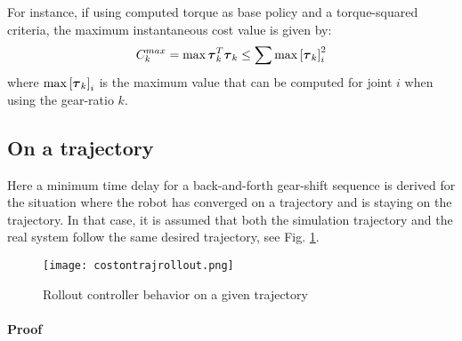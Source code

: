 For instance, if using computed torque as base policy and a torque-squared criteria, the maximum instantaneous cost value is given by:
%
\begin{align}
C_k^{max} =  \operatornamewithlimits{max} \vec{\tau}_k^T \vec{\tau}_k \leq \sum \operatornamewithlimits{max} \left[\vec{\tau}_{k}\right]_{i}^2 
\end{align}
%
where $\operatornamewithlimits{max} \left[\vec{\tau}_{k}\right]_{i}$ is the maximum value that can be computed for joint $i$ when using the gear-ratio $k$.

\subsection{On a trajectory}
\label{sec:chat1}

Here a minimum time delay for a back-and-forth gear-shift sequence is derived for the situation where the robot has converged on a trajectory and is staying on the trajectory. In that case, it is assumed that both the simulation trajectory and the real system follow the same desired trajectory, see Fig. \ref{fig:costontrajrollout}.

\begin{figure}[H]
	\centering
		\texttt{[image: costontrajrollout.png]}
	\caption{Rollout controller behavior on a given trajectory}
	\label{fig:costontrajrollout}
\end{figure}


\paragraph{Proof} 

